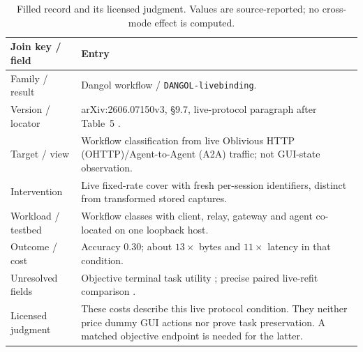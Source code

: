 \begin{table}[t]\centering\footnotesize
\caption{Filled record and its licensed judgment. Values are source-reported; no cross-mode effect is computed.}\label{tab:result-lineage}
\begin{tabularx}{\columnwidth}{@{}p{}Y@{}}\toprule
Join key / field & Entry\\\midrule
Family / result & Dangol workflow / \texttt{DANGOL-livebinding}.\\
Version / locator & arXiv:2606.07150v3, \S9.7, live-protocol paragraph after Table~5 \cite{dangol2026workflow}.\\
Target / view & Workflow classification from live Oblivious HTTP (OHTTP)/Agent-to-Agent (A2A) traffic; not GUI-state observation.\\
Intervention & Live fixed-rate cover with fresh per-session identifiers, distinct from transformed stored captures.\\
Workload / testbed & Workflow classes with client, relay, gateway and agent co-located on one loopback host.\\
Outcome / cost & Accuracy 0.30; about $13\times$ bytes and $11\times$ latency in that condition.\\
Unresolved fields & Objective terminal task utility \NRR{}; precise paired live-refit comparison \NRV{}.\\
Licensed judgment & These costs describe this live protocol condition. They neither price dummy GUI actions nor prove task preservation. A matched objective endpoint is needed for the latter.\\\bottomrule
\end{tabularx}\end{table}
